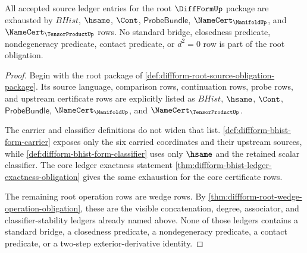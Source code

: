 \begin{theorem}
\label{thm:diffform-root-source-ledger-obligation}
All accepted source ledger entries for the root $\DiffFormUp$ package are
exhausted by $BHist$, $\hsame$, $\Cont$, $\mathsf{ProbeBundle}$,
$\NameCert_{\ManifoldUp}$, and $\NameCert_{\TensorProductUp}$ rows. No
standard bridge, closedness predicate, nondegeneracy predicate, contact
predicate, or $d^2=0$ row is part of the root obligation.
\end{theorem}
\begin{proof}
Begin with the root package of
\autoref{def:diffform-root-source-obligation-package}. Its source language,
comparison rows, continuation rows, probe rows, and upstream certificate rows
are explicitly listed as $BHist$, $\hsame$, $\Cont$,
$\mathsf{ProbeBundle}$, $\NameCert_{\ManifoldUp}$, and
$\NameCert_{\TensorProductUp}$.

The carrier and classifier definitions do not widen that list.
\autoref{def:diffform-bhist-form-carrier} exposes only the six carried
coordinates and their upstream sources, while
\autoref{def:diffform-bhist-form-classifier} uses only $\hsame$ and the
retained scalar classifier. The core ledger exactness statement
\autoref{thm:diffform-bhist-ledger-exactness-obligation} gives the same
exhaustion for the core certificate rows.

The remaining root operation rows are wedge rows. By
\autoref{thm:diffform-root-wedge-operation-obligation}, these are the visible
concatenation, degree, associator, and classifier-stability ledgers already
named above. None of those ledgers contains a standard bridge, a closedness
predicate, a nondegeneracy predicate, a contact predicate, or a two-step
exterior-derivative identity.
\end{proof}

